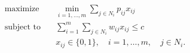 \begin{align*}
\text{maximize} \quad & \min_{i=1, \ldots, m} \sum_{j \in N_i} p_{ij} x_{ij} \\
\text{subject to} \quad & \sum_{i=1}^m \sum_{j \in N_i} w_{ij} x_{ij} \leq c \\
& x_{ij} \in \lbrace 0, 1 \rbrace, \quad i = 1, \ldots, m, \quad j \in N_i.
\end{align*}

